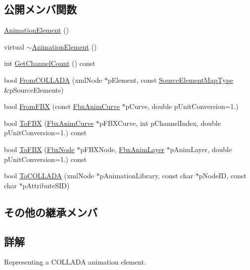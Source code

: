 \subsection*{公開メンバ関数}
\begin{DoxyCompactItemize}
\item 
\hyperlink{class_animation_element_a1c52f1799ec9f0a64270aa0602bc036c}{Animation\+Element} ()
\item 
virtual \hyperlink{class_animation_element_ad8f5739e70502e9abaa7bc9e0c1384d2}{$\sim$\+Animation\+Element} ()
\item 
int \hyperlink{class_animation_element_a2c02d9a40137240eea5c3bc867c59fa3}{Get\+Channel\+Count} () const
\item 
bool \hyperlink{class_animation_element_ad0a36ae16945ef4a3027bb8f57452c45}{From\+C\+O\+L\+L\+A\+DA} (xml\+Node $\ast$p\+Element, const \hyperlink{fbxcolladautils_8h_a43e0f8079e4c5df7b8b0496de1f120c3}{Source\+Element\+Map\+Type} \&p\+Source\+Elements)
\item 
bool \hyperlink{class_animation_element_a44a774ba612fb2707dee931048231686}{From\+F\+BX} (const \hyperlink{class_fbx_anim_curve}{Fbx\+Anim\+Curve} $\ast$p\+Curve, double p\+Unit\+Conversion=1.)
\item 
bool \hyperlink{class_animation_element_af26601574516e4a3d05a5e8a611b6ea5}{To\+F\+BX} (\hyperlink{class_fbx_anim_curve}{Fbx\+Anim\+Curve} $\ast$p\+F\+B\+X\+Curve, int p\+Channel\+Index, double p\+Unit\+Conversion=1.) const
\item 
bool \hyperlink{class_animation_element_a97828e118006d28ad27aae3d3a668b66}{To\+F\+BX} (\hyperlink{class_fbx_node}{Fbx\+Node} $\ast$p\+F\+B\+X\+Node, \hyperlink{class_fbx_anim_layer}{Fbx\+Anim\+Layer} $\ast$p\+Anim\+Layer, double p\+Unit\+Conversion=1.) const
\item 
bool \hyperlink{class_animation_element_ac697ab978aa85e18c65eaf651db69c6a}{To\+C\+O\+L\+L\+A\+DA} (xml\+Node $\ast$p\+Animation\+Library, const char $\ast$p\+Node\+ID, const char $\ast$p\+Attribute\+S\+ID)
\end{DoxyCompactItemize}
\subsection*{その他の継承メンバ}


\subsection{詳解}
Representing a C\+O\+L\+L\+A\+DA animation element. 

